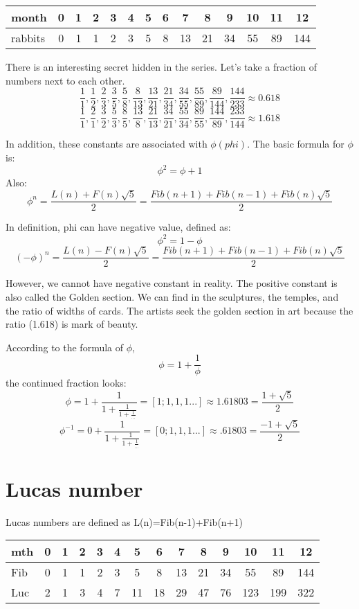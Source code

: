 \documentclass{jreport}
\begin{document}
\begin{table}[htbp]
\begin{center}
\begin{tabular}{|l|c|c|c|c|c|c|c|c|c|c|c|c|c|}
\hline
month & 0 & 1 & 2 & 3 & 4 & 5 & 6 & 7 & 8 & 9 & 10 & 11 & 12\\
\hline
rabbits & 0 & 1 & 1 & 2 & 3 & 5 & 8 & 13 & 21 & 34 & 55 & 89 & 144\\
\hline
\end{tabular}
\end{center}
\end{table}

There is an interesting secret hidden in the series. Let's take a fraction of numbers next to each other.
\[\frac{1}{1},\frac{1}{2},\frac{2}{3},\frac{3}{5},\frac{5}{8},\frac{8}{13},\frac{13}{21},\frac{21}{34},\frac{34}{55},\frac{55}{89},\frac{89}{144},\frac{144}{233} \approx 0.618\]
\[\frac{1}{1},\frac{2}{1},\frac{3}{2},\frac{5}{3},\frac{8}{5},\frac{13}{8},\frac{21}{13},\frac{34}{21},\frac{55}{34},\frac{89}{55},\frac{144}{89},\frac{233}{144} \approx 1.618\]

In addition, these constants are associated with $\phi(phi)$. The basic formula for $\phi$ is:
\[\phi^2 = \phi + 1\]
Also:
\[\phi^n = \frac{L(n)+F(n)\sqrt{5}}{2} = \frac{Fib(n+1)+Fib(n-1)+Fib(n)\sqrt{5}}{2}\]

In definition, phi can have negative value, defined as:
\[\phi^2 = 1 - \phi\]
\[(-\phi)^n = \frac{L(n)-F(n)\sqrt{5}}{2} = \frac{Fib(n+1)+Fib(n-1)+Fib(n)\sqrt{5}}{2}\]

However, we cannot have negative constant in reality. The positive constant is also called the Golden section. We can find in the sculptures, the temples, and the ratio of widths of cards. The artists seek the golden section in art because the ratio (1.618) is mark of beauty.

According to the formula of $\phi$,
\[\phi = 1+\frac{1}{\phi}\]
the continued fraction looks:
\[\phi=1+\frac{1}{1+\frac{1}{1+\frac{1}{...}}}=[1;1,1,1...]\approx1.61803=\frac{1+\sqrt{5}}{2}\]
\[\phi^{-1}=0+\frac{1}{1+\frac{1}{1+\frac{1}{...}}}=[0;1,1,1...]\approx.61803=\frac{-1+\sqrt{5}}{2}\]

\section*{Lucas number}

Lucas numbers are defined as L(n)=Fib(n-1)+Fib(n+1)
\begin{table}[htbp]
\begin{center}
\begin{tabular}{|l|c|c|c|c|c|c|c|c|c|c|c|c|c|}
\hline
mth & 0 & 1 & 2 & 3 & 4 & 5 & 6 & 7 & 8 & 9 & 10 & 11 & 12\\
\hline
Fib & 0 & 1 & 1 & 2 & 3 & 5 & 8 & 13 & 21 & 34 & 55 & 89 & 144\\
\hline
Luc & 2 & 1 & 3 & 4 & 7 & 11 & 18 & 29 & 47 & 76 & 123 & 199 & 322\\
\hline
\end{tabular}
\end{center}
\end{table}
\end{document}
